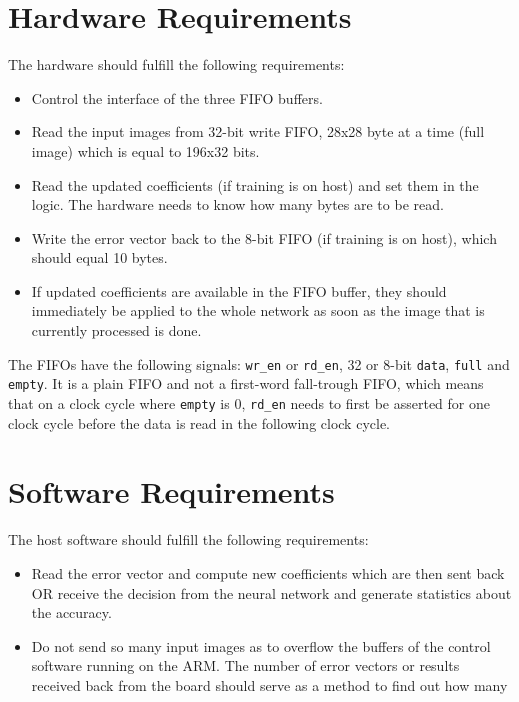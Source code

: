 \documentclass[12pt]{article}
\begin{document}
\section{Hardware Requirements}
The hardware should fulfill the following requirements:
\begin{itemize}
	\item Control the interface of the three \ac{FIFO} buffers.
	\item Read the input images from 32-bit write \ac{FIFO}, 28x28 byte at a time (full image) which is equal to 196x32 bits.
	\item Read the updated coefficients (if training is on host) and set them in the logic. The hardware needs to know how many bytes are to be read.
	\item Write the error vector back to the 8-bit \ac{FIFO} (if training is on host), which should equal 10 bytes.
	\item If updated coefficients are available in the \ac{FIFO} buffer, they should immediately be applied to the whole network as soon as the image that is currently processed is done.
\end{itemize}
The \ac{FIFO}s have the following signals: \verb|wr_en| or \verb|rd_en|, 32 or 8-bit \verb|data|, \verb|full| and \verb|empty|. It is a plain \ac{FIFO} and not a first-word fall-trough \ac{FIFO}, which means that on a clock cycle where \verb|empty| is 0, \verb|rd_en| needs to first be asserted for one clock cycle before the data is read in the following clock cycle.
\section{Software Requirements}
The host software should fulfill the following requirements:
\begin{itemize}
	\item Read the error vector and compute new coefficients which are then sent back OR receive the decision from the neural network and generate statistics about the accuracy.
	\item Do not send so many input images as to overflow the buffers of the control software running on the ARM. The number of error vectors or results received back from the board should serve as a method to find out how many 
\end{itemize}
\end{document}
